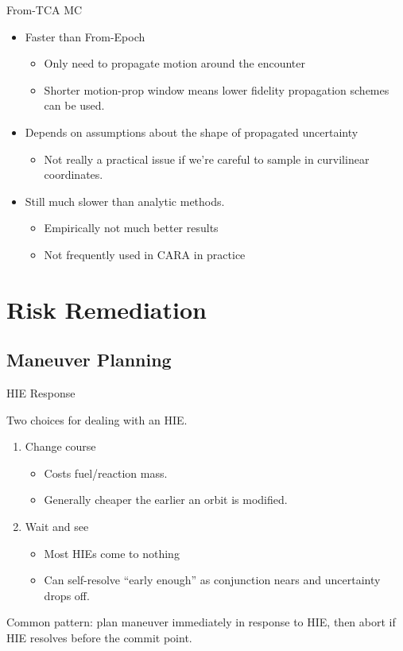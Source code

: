 \documentclass[pdf]{beamer}
\begin{document}
\begin{frame}{From-TCA MC}
  \begin{itemize}
  \item Faster than From-Epoch
    \begin{itemize}
    \item Only need to propagate motion around the encounter
    \item Shorter motion-prop window means lower fidelity propagation schemes
      can be used.
    \end{itemize}
  \item Depends on assumptions about the shape of propagated uncertainty
    \begin{itemize}
    \item Not really a practical issue if we're careful to sample in curvilinear
      coordinates.
    \end{itemize}
  \item Still much slower than analytic methods.
    \begin{itemize}
    \item Empirically not much better results
    \item Not frequently used in CARA in practice
    \end{itemize}
  \end{itemize}
\end{frame}

\section{Risk Remediation}
\subsection{Maneuver Planning}

\begin{frame}{HIE Response}

  Two choices for dealing with an HIE.
  
  \begin{enumerate}
  \item Change course
    \begin{itemize}
    \item Costs fuel/reaction mass.
    \item Generally cheaper the earlier an orbit is modified.
    \end{itemize}
  \item Wait and see
    \begin{itemize}
    \item Most HIEs come to nothing
    \item Can self-resolve ``early enough'' as conjunction nears and uncertainty
      drops off.
    \end{itemize}
  \end{enumerate}

  Common pattern: plan maneuver immediately in response to HIE, then abort if
HIE resolves before the commit point.
\end{frame}
\end{document}
